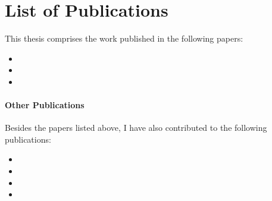 \section{List of Publications\label{sec:publications}}
This thesis comprises the work published in the following papers:

\begin{itemize}
    \item {}
    \item {}
    \item {}
\end{itemize}

\paragraph{Other Publications} Besides the papers listed above, I have also
contributed to the following publications:

\begin{itemize}
    \item {}
    \item {}
    \item {}
    \item {}
\end{itemize}